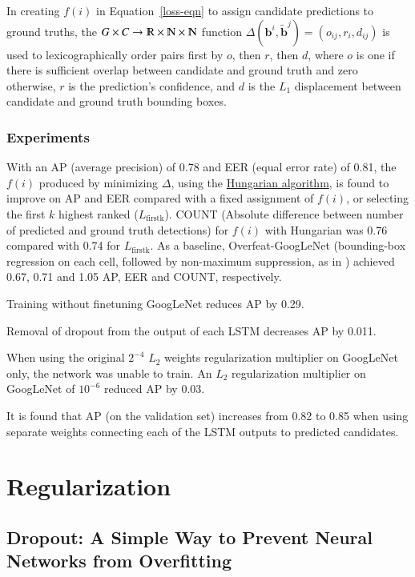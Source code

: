 \documentclass[a4paper, 12pt]{article}
\begin{document}
In creating $f(i)$ in Equation~\ref{loss-eqn} to assign candidate predictions
to ground truths, the
$G \times C \rightarrow \varmathbb{R} \times \varmathbb{N} \times \varmathbb{N}$
function
$\Delta\left(\boldsymbol{b}^i, \tilde{\boldsymbol{b}}^j\right) = (o_{ij}, r_i, d_{ij})$
is used to lexicographically order pairs first by $o$, then $r$, then $d$,
where $o$ is one if there is sufficient overlap between candidate and ground
truth and zero otherwise, $r$ is the prediction's confidence, and $d$ is the
$L_1$ displacement between candidate and ground truth bounding boxes.

\subsubsection{Experiments}

With an AP (average precision) of 0.78 and EER (equal error rate) of 0.81, the
$f(i)$ produced by minimizing $\Delta$, using the
\href{https://en.wikipedia.org/wiki/Hungarian_algorithm}{Hungarian algorithm},
is found to improve on AP and EER compared with a fixed assignment of $f(i)$,
or selecting the first $k$ highest ranked ($L_\textrm{firstk}$). COUNT
(Absolute difference between number of predicted and ground truth detections)
for $f(i)$ with Hungarian was 0.76 compared with 0.74 for $L_\textrm{firstk}$.
As a baseline, Overfeat-GoogLeNet (bounding-box regression on each cell,
followed by non-maximum suppression, as in
\citet{DBLP:journals/corr/SermanetEZMFL13}) achieved 0.67, 0.71 and 1.05 AP, EER
and COUNT, respectively.

Training without finetuning GoogLeNet reduces AP by 0.29.

Removal of dropout from the output of each LSTM decreases AP by 0.011.

When using the original $2^{-4}$ $L_2$ weights regularization multiplier on
GoogLeNet only, the network was unable to train.  An $L_2$ regularization
multiplier on GoogLeNet of $10^{-6}$ reduced AP by 0.03.

It is found that AP (on the validation set) increases from 0.82 to 0.85 when
using separate weights connecting each of the LSTM outputs to predicted
candidates.


\section{Regularization}


\subsection{Dropout: A Simple Way to Prevent Neural Networks from
            Overfitting\citet{Srivastava:2014:DSW:2627435.2670313}}
\label{dropout}
\end{document}
